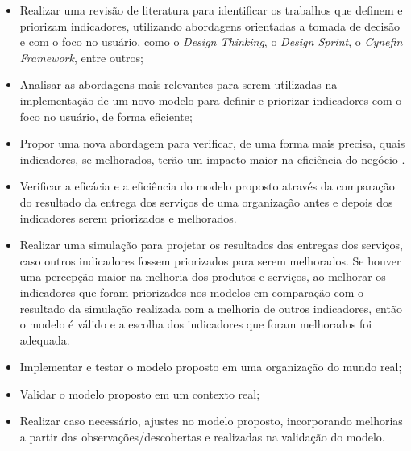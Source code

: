 \begin{itemize}

    \item Realizar uma revisão de literatura para identificar os trabalhos que definem e priorizam indicadores, utilizando abordagens orientadas a tomada de decisão e com o foco no usuário, como o \textit{Design Thinking}, o \textit{Design Sprint}, o \textit{Cynefin Framework}, entre outros;
    
    \item Analisar as abordagens mais relevantes para serem utilizadas na implementação de um novo modelo para definir e priorizar indicadores com o foco no usuário, de forma eficiente;
    
    \item Propor uma nova abordagem para verificar, de uma forma mais precisa, quais indicadores, se melhorados, terão um impacto maior na eficiência do negócio . 
    
    \item Verificar a eficácia e a eficiência do modelo proposto através da comparação do resultado da entrega dos serviços de uma organização antes e depois dos indicadores serem priorizados e melhorados. 
    
    \item Realizar uma simulação para projetar os resultados das entregas dos serviços, caso outros indicadores fossem priorizados para serem melhorados. Se houver uma percepção maior na melhoria dos produtos e serviços, ao melhorar os indicadores que foram priorizados nos modelos em comparação com o resultado da simulação realizada com a melhoria de outros indicadores, então o modelo é válido e a escolha dos indicadores que foram melhorados foi adequada.
    
    \item Implementar e testar o modelo proposto em uma organização do mundo real;
    
    \item Validar o modelo proposto em um contexto real;
    
    \item Realizar caso necessário, ajustes no modelo proposto, incorporando melhorias a partir das observações/descobertas e realizadas na validação do modelo. 

\end{itemize}

